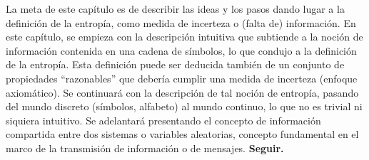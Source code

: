 {\color{red} La  meta de este cap\'itulo es  de describir las ideas  y los pasos
  dando lugar  a la definici\'on  de la entrop\'ia,  como medida de  incerteza o
  (falta de) informaci\'on.  En este cap\'itulo, se empieza con la descripci\'on
  intuitiva que subtiende a la noci\'on de informaci\'on contenida en una cadena
  de  s\'imbolos, lo  que  condujo a  la  definici\'on de  la entrop\'ia.   Esta
  definici\'on  puede  ser deducida  tambi\'en  de  un  conjunto de  propiedades
  ``razonables''  que  deber\'ia  cumplir   una  medida  de  incerteza  (enfoque
  axiom\'atico).   Se  continuar\'a con  la  descripci\'on  de  tal noci\'on  de
  entrop\'ia,  pasando  del  mundo  discreto  (s\'imbolos,  alfabeto)  al  mundo
  continuo,  lo  que no  es  trivial  ni  siquiera intuitivo.   Se  adelantar\'a
  presentando  el concepto  de  informaci\'on compartida  entre  dos sistemas  o
  variables aleatorias, concepto fundamental en  el marco de la transmisi\'on de
  informaci\'on o de mensajes. \bf Seguir. }
